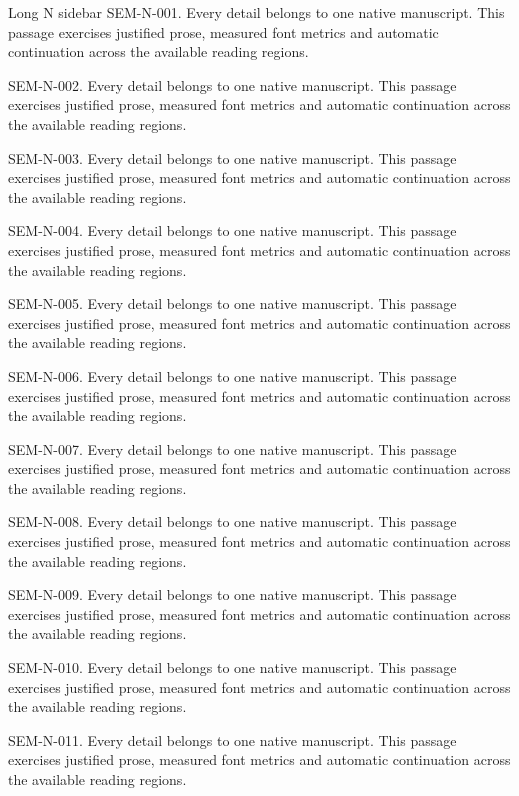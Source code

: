 \begin{m20sidebar}[id=long-narrow]{Long N sidebar}
SEM-N-001. Every detail belongs to one native manuscript. This passage exercises justified prose, measured font metrics and automatic continuation across the available reading regions.\par
SEM-N-002. Every detail belongs to one native manuscript. This passage exercises justified prose, measured font metrics and automatic continuation across the available reading regions.\par
SEM-N-003. Every detail belongs to one native manuscript. This passage exercises justified prose, measured font metrics and automatic continuation across the available reading regions.\par
SEM-N-004. Every detail belongs to one native manuscript. This passage exercises justified prose, measured font metrics and automatic continuation across the available reading regions.\par
SEM-N-005. Every detail belongs to one native manuscript. This passage exercises justified prose, measured font metrics and automatic continuation across the available reading regions.\par
SEM-N-006. Every detail belongs to one native manuscript. This passage exercises justified prose, measured font metrics and automatic continuation across the available reading regions.\par
SEM-N-007. Every detail belongs to one native manuscript. This passage exercises justified prose, measured font metrics and automatic continuation across the available reading regions.\par
SEM-N-008. Every detail belongs to one native manuscript. This passage exercises justified prose, measured font metrics and automatic continuation across the available reading regions.\par
SEM-N-009. Every detail belongs to one native manuscript. This passage exercises justified prose, measured font metrics and automatic continuation across the available reading regions.\par
SEM-N-010. Every detail belongs to one native manuscript. This passage exercises justified prose, measured font metrics and automatic continuation across the available reading regions.\par
SEM-N-011. Every detail belongs to one native manuscript. This passage exercises justified prose, measured font metrics and automatic continuation across the available reading regions.\par

\end{m20sidebar}
